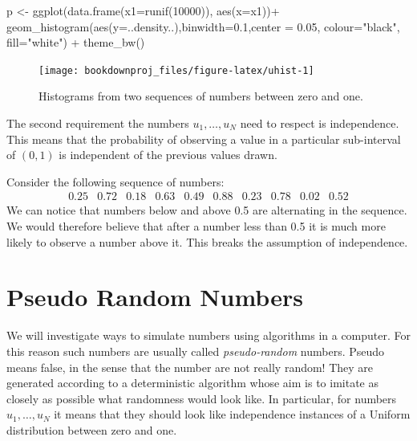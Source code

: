 \documentclass[
]{book}
\newenvironment{Shaded}{\begin{snugshade}}{\end{snugshade}}
\newcommand{\AttributeTok}[1]{\textcolor[rgb]{0.77,0.63,0.00}{#1}}
\newcommand{\DecValTok}[1]{\textcolor[rgb]{0.00,0.00,0.81}{#1}}
\newcommand{\FloatTok}[1]{\textcolor[rgb]{0.00,0.00,0.81}{#1}}
\newcommand{\FunctionTok}[1]{\textcolor[rgb]{0.00,0.00,0.00}{#1}}
\newcommand{\NormalTok}[1]{#1}
\newcommand{\OtherTok}[1]{\textcolor[rgb]{0.56,0.35,0.01}{#1}}
\newcommand{\SpecialCharTok}[1]{\textcolor[rgb]{0.00,0.00,0.00}{#1}}
\newcommand{\StringTok}[1]{\textcolor[rgb]{0.31,0.60,0.02}{#1}}
\theoremstyle{definition}
\theoremstyle{definition}
\theoremstyle{definition}
\theoremstyle{definition}
\theoremstyle{remark}
\begin{document}
\begin{Shaded}
\begin{Highlighting}[]
\NormalTok{p }\OtherTok{\textless{}{-}} \FunctionTok{ggplot}\NormalTok{(}\FunctionTok{data.frame}\NormalTok{(}\AttributeTok{x1=}\FunctionTok{runif}\NormalTok{(}\DecValTok{10000}\NormalTok{)), }\FunctionTok{aes}\NormalTok{(}\AttributeTok{x=}\NormalTok{x1))}\SpecialCharTok{+}
   \FunctionTok{geom\_histogram}\NormalTok{(}\FunctionTok{aes}\NormalTok{(}\AttributeTok{y=}\NormalTok{..density..),}\AttributeTok{binwidth=}\FloatTok{0.1}\NormalTok{,}\AttributeTok{center =} \FloatTok{0.05}\NormalTok{, }\AttributeTok{colour=}\StringTok{"black"}\NormalTok{, }\AttributeTok{fill=}\StringTok{"white"}\NormalTok{)  }\SpecialCharTok{+} \FunctionTok{theme\_bw}\NormalTok{() }
\end{Highlighting}
\end{Shaded}

\begin{figure}

{\centering \texttt{[image: bookdownproj\_files/figure-latex/uhist-1]} 

}

\caption{Histograms from two sequences of numbers between zero and one.}\label{fig:uhist}
\end{figure}

The second requirement the numbers \(u_1,\dots,u_N\) need to respect is independence. This means that the probability of observing a value in a particular sub-interval of \((0,1)\) is independent of the previous values drawn.

Consider the following sequence of numbers:
\[
\begin{array}{cccccccccc}
0.25 & 0.72 & 0.18 & 0.63 & 0.49 & 0.88 & 0.23 & 0.78 & 0.02 & 0.52
\end{array}
\]
We can notice that numbers below and above 0.5 are alternating in the sequence. We would therefore believe that after a number less than 0.5 it is much more likely to observe a number above it. This breaks the assumption of independence.

\hypertarget{pseudo-random-numbers}{%
\section{Pseudo Random Numbers}\label{pseudo-random-numbers}}

We will investigate ways to simulate numbers using algorithms in a computer. For this reason such numbers are usually called \emph{pseudo-random} numbers. Pseudo means false, in the sense that the number are not really random! They are generated according to a deterministic algorithm whose aim is to imitate as closely as possible what randomness would look like. In particular, for numbers \(u_1,\dots,u_N\) it means that they should look like independence instances of a Uniform distribution between zero and one.
\end{document}
